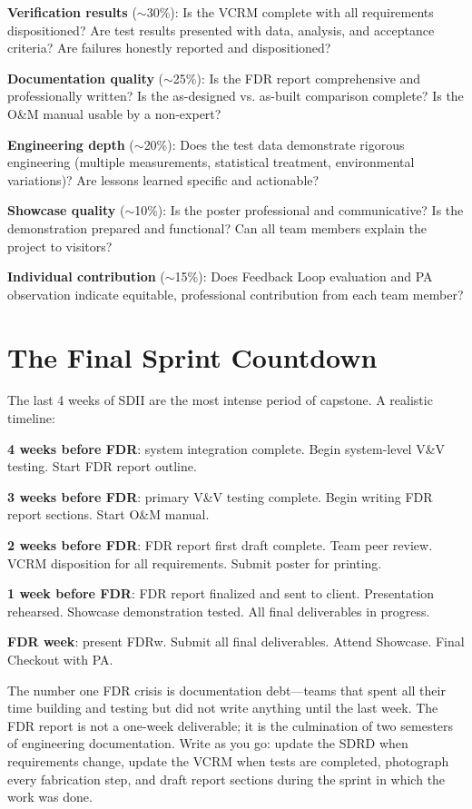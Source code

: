 \textbf{Verification results} ($\sim$30\%): Is the VCRM complete with all requirements dispositioned? Are test results presented with data, analysis, and acceptance criteria? Are failures honestly reported and dispositioned?

\textbf{Documentation quality} ($\sim$25\%): Is the FDR report comprehensive and professionally written? Is the as-designed vs. as-built comparison complete? Is the O\&M manual usable by a non-expert?

\textbf{Engineering depth} ($\sim$20\%): Does the test data demonstrate rigorous engineering (multiple measurements, statistical treatment, environmental variations)? Are lessons learned specific and actionable?

\textbf{Showcase quality} ($\sim$10\%): Is the poster professional and communicative? Is the demonstration prepared and functional? Can all team members explain the project to visitors?

\textbf{Individual contribution} ($\sim$15\%): Does Feedback Loop evaluation and PA observation indicate equitable, professional contribution from each team member?

\section{The Final Sprint Countdown}
The last 4 weeks of SDII are the most intense period of capstone. A realistic timeline:

\textbf{4 weeks before FDR}: system integration complete. Begin system-level V\&V testing. Start FDR report outline.

\textbf{3 weeks before FDR}: primary V\&V testing complete. Begin writing FDR report sections. Start O\&M manual.

\textbf{2 weeks before FDR}: FDR report first draft complete. Team peer review. VCRM disposition for all requirements. Submit poster for printing.

\textbf{1 week before FDR}: FDR report finalized and sent to client. Presentation rehearsed. Showcase demonstration tested. All final deliverables in progress.

\textbf{FDR week}: present FDRw. Submit all final deliverables. Attend Showcase. Final Checkout with PA.

\begin{warningbox}
The number one FDR crisis is documentation debt---teams that spent all their time building and testing but did not write anything until the last week. The FDR report is not a one-week deliverable; it is the culmination of two semesters of engineering documentation. Write as you go: update the SDRD when requirements change, update the VCRM when tests are completed, photograph every fabrication step, and draft report sections during the sprint in which the work was done.
\end{warningbox}



